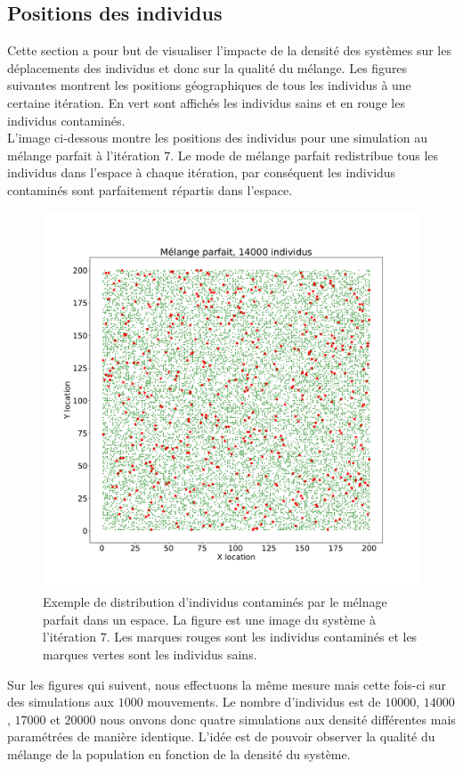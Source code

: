\subsection{Positions des individus}

Cette section a pour but de visualiser l'impacte de la densité des systèmes sur les déplacements des individus et donc sur la qualité du mélange. Les figures suivantes montrent les positions géographiques de tous les individus à une certaine itération. En vert sont affichés les individus sains et en rouge les individus contaminés.\\

L'image ci-dessous montre les positions des individus pour une simulation au mélange parfait à l'itération $7$. Le mode de mélange parfait redistribue tous les individus dans l'espace à chaque itération, par conséquent les individus contaminés sont parfaitement répartis dans l'espace.

\begin{figure}[h]
	\centering
	\captionsetup{justification=centering}
	\includegraphics[width=.7\textwidth]{Images/SI_positions_14k_mix.pdf}
	\caption[Positions des individus : mélange parfait]{Exemple de distribution d'individus contaminés par le mélnage parfait dans un espace. La figure est une image du système à l'itération $7$. Les marques rouges sont les individus contaminés et les marques vertes sont les individus sains.}
\end{figure}

\newpage

Sur les figures qui suivent, nous effectuons la même mesure mais cette fois-ci sur des simulations aux $1000$ mouvements. Le nombre d'individus est de $10000$, $14000$, $17000$ et $20000$ nous onvons donc quatre simulations aux densité différentes mais paramétrées de manière identique. L'idée est de pouvoir observer la qualité du mélange de la population en fonction de la densité du système.

